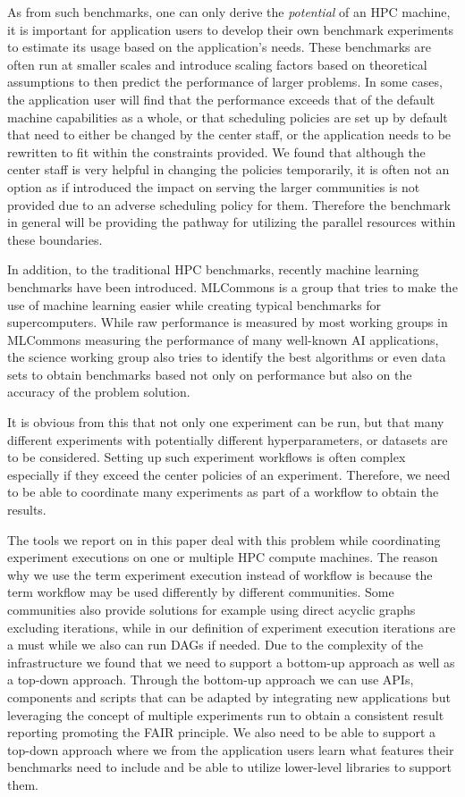 \documentclass[utf8]{FrontiersinVancouver} %
\begin{document}
As from such benchmarks, one can only derive the {\em potential} of an HPC machine, it is important for application users to develop their own benchmark experiments to estimate its usage based on the application's needs. These benchmarks are often run at smaller scales and introduce scaling factors based on theoretical assumptions to then predict the performance of larger problems. In some cases, the application user will find that the performance exceeds that of the default machine capabilities as a whole, or that scheduling policies are set up by default that need to either be changed by the center staff, or the application needs to be rewritten to fit within the constraints provided. We found that although the center staff is very helpful in changing the policies temporarily, it is often not an option as if introduced the impact on serving the larger communities is not provided due to an adverse scheduling policy for them. Therefore the benchmark in general will be providing the pathway for utilizing the parallel resources within these boundaries.

In addition, to the traditional HPC benchmarks, recently machine learning benchmarks have been introduced. MLCommons is a group that tries to make the use of machine learning easier while creating typical benchmarks for supercomputers. While raw performance is measured by most working groups in MLCommons measuring the performance of many well-known AI applications, the science working group also tries to identify the best algorithms or even data sets to obtain benchmarks based not only on performance but also on the accuracy of the problem solution.

It is obvious from this that not only one experiment can be run, but that many different experiments with potentially different hyperparameters, or datasets are to be considered. Setting up such experiment workflows is often complex especially if they exceed the center policies of an experiment. Therefore, we need to be able to coordinate many experiments as part of a workflow to obtain the results.

The tools we report on in this paper deal with this problem while coordinating experiment executions on one or multiple HPC compute machines.
The reason why we use the term experiment execution instead of workflow is because the term workflow may be used differently by different communities. Some communities also provide solutions for example using direct acyclic graphs excluding iterations, while in our definition of experiment execution iterations are a must while we also can run DAGs if needed. 
Due to the complexity of the infrastructure we found that we need to support a bottom-up approach as well as a top-down approach.
Through the bottom-up approach we can use APIs, components and scripts that can be adapted by integrating new applications but leveraging the concept of multiple experiments run to obtain a consistent result reporting promoting the FAIR principle.
We also need to be able to support a top-down approach where we from the application users learn what features their benchmarks need to include and be able to utilize lower-level libraries to support them.
\end{document}
